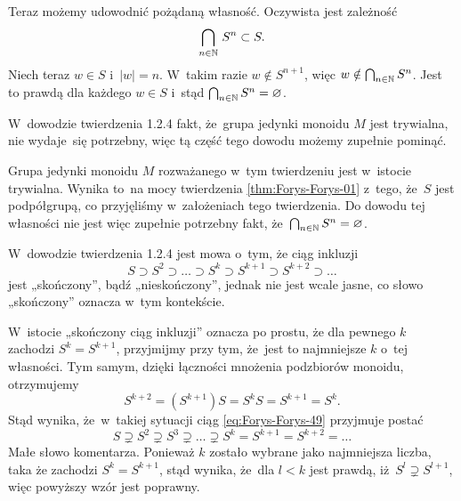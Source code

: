 \documentclass[a4paper,11pt]{article}
\begin{document}
Teraz możemy udowodnić pożądaną własność. Oczywista jest zależność
\begin{equation}
  \label{eq:Forys-Forys-48}
  \bigcap_{ n \in \mathbb{N} } \, S^{ n } \subset S.
\end{equation}
Niech teraz $w \in S$ i~$| w | = n$. W~takim razie
$w \notin S^{ n + 1 }$, więc
$w \notin \bigcap_{ n \in \mathbb{N} } S^{ n }$. Jest to prawdą dla każdego
$w \in S$ i~stąd $\bigcap_{ n \in \mathbb{N} } S^{ n } = \varnothing$.

\vspace{\spaceFour}





\start {} W~dowodzie twierdzenia 1.2.4 fakt, że~grupa jedynki
monoidu $M$ jest trywialna, nie wydaje~się potrzebny, więc tą część
tego dowodu możemy zupełnie pominąć.

Grupa jedynki monoidu $M$ rozważanego w~tym twierdzeniu jest w~istocie
trywialna. Wynika to~na mocy twierdzenia \ref{thm:Forys-Forys-01}
z~tego, że~$S$ jest podpółgrupą, co przyjęliśmy w~założeniach tego
twierdzenia. Do dowodu tej własności nie jest więc zupełnie potrzebny
fakt, że~$\bigcap_{ n \in \mathbb{N} } S^{ n } = \varnothing$.

\vspace{\spaceFour}





\start {} W~dowodzie twierdzenia 1.2.4 jest mowa o~tym, że ciąg
inkluzji
\begin{equation}
  \label{eq:Forys-Forys-49}
  S \supset S^{ 2 } \supset \ldots \supset S^{ k } \supset S^{ k + 1 } \supset S^{ k + 2 } \supset \ldots
\end{equation}
jest „skończony”, bądź „nieskończony”, jednak nie jest wcale jasne, co
słowo „skończony” oznacza w~tym kontekście.

W~istocie „skończony ciąg inkluzji” oznacza po prostu, że dla pewnego
$k$ zachodzi $S^{ k } = S^{ k + 1 }$, przyjmijmy przy tym, że~jest to
najmniejsze $k$ o~tej własności. Tym samym, dzięki łączności mnożenia
podzbiorów monoidu, otrzymujemy
\begin{equation}
  \label{eq:Forys-Forys-50}
  S^{ k + 2 } = ( S^{ k + 1 } ) S = S^{ k } S = S^{ k + 1 } = S^{ k }.
\end{equation}
Stąd wynika, że~w~takiej sytuacji ciąg \eqref{eq:Forys-Forys-49}
przyjmuje postać
\begin{equation}
  \label{eq:Forys-Forys-51}
  S \supsetneq S^{ 2 } \supsetneq S^{ 3 } \supsetneq \ldots \supsetneq S^{ k } = S^{ k + 1 } = S^{ k + 2 } = \ldots
\end{equation}
Małe słowo komentarza. Ponieważ $k$ zostało wybrane jako najmniejsza
liczba, taka że zachodzi $S^{ k } = S^{ k + 1 }$, stąd wynika, że~dla
$l < k$ jest prawdą, iż~$S^{ l } \supsetneq S^{ l + 1 }$, więc powyższy wzór
jest poprawny.
\end{document}
